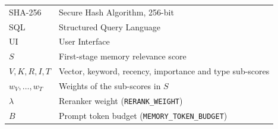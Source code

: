 \begin{longtable}{p{3.5cm} p{10cm}}
    SHA-256 & Secure Hash Algorithm, 256-bit \\[2pt]
    SQL     & Structured Query Language \\[2pt]
    UI      & User Interface \\[2pt]
    \midrule
    $S$     & First-stage memory relevance score \\[2pt]
    $V, K, R, I, T$ & Vector, keyword, recency, importance and type sub-scores \\[2pt]
    $w_V,\dots,w_T$ & Weights of the sub-scores in $S$ \\[2pt]
    $\lambda$ & Reranker weight (\texttt{RERANK\_WEIGHT}) \\[2pt]
    $B$     & Prompt token budget (\texttt{MEMORY\_TOKEN\_BUDGET}) \\[2pt]
    \bottomrule
\end{longtable}
